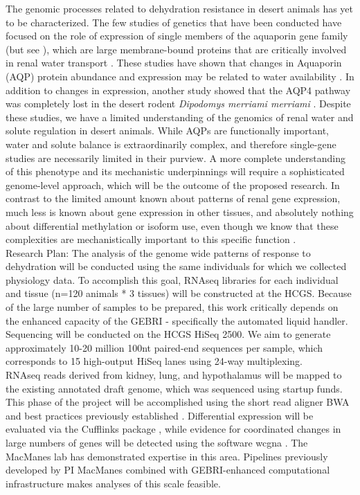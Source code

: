 \documentclass[12pt]{article}
\begin{document}
The genomic processes related to dehydration resistance in desert animals has yet to be characterized. The few studies of genetics that have been conducted have focused on the role of expression of single members of the aquaporin gene family (but see \cite{Bartolo:2007hy}), which are large membrane-bound proteins that are critically involved in renal water transport \citep{Kwon:2009bv,Verkman:2002ww,Brown:1995vo,Nielsen:1995cb}. These studies have shown that changes in Aquaporin (AQP) protein abundance and expression may be related to water availability \citep{Boselt:2009fb, Gallardo:2005fm,Bozinovic:2003eg}. In addition to changes in expression, another study showed that the AQP4 pathway was completely lost in the desert rodent \textit{Dipodomys merriami merriami} \citep{Huang:2001ti}. Despite these studies, we have a limited understanding of the genomics of renal water and solute regulation in desert animals. While AQPs are functionally important, water and solute balance is extraordinarily complex, and therefore single-gene studies are necessarily limited in their purview. A more complete understanding of this phenotype and its mechanistic underpinnings will require a sophisticated genome-level approach, which will be the outcome of the proposed research. In contrast to the limited amount known about patterns of renal gene expression, much less is known about gene expression in other tissues, and absolutely nothing about differential methylation or isoform use, even though we know that these complexities are mechanistically important to this specific function \citep{Yukutake:2010ia,Silberstein:2004ex}. \\

Research Plan: The analysis of the genome wide patterns of response to dehydration will be conducted using the same individuals for which we collected physiology data. To accomplish this goal, RNAseq libraries for each individual and tissue (n=120 animals * 3 tissues) will be constructed at the HCGS. Because of the large number of samples to be prepared, this work critically depends on the enhanced capacity of the GEBRI - specifically the automated liquid handler. Sequencing will be conducted on the HCGS HiSeq 2500. We aim to generate approximately 10-20 million 100nt paired-end sequences per sample, which corresponds to 15 high-output HiSeq lanes using 24-way multiplexing. \\ 

RNAseq reads derived from kidney, lung, and hypothalamus will be mapped to the existing annotated draft genome, which was sequenced using startup funds. This phase of the project will be accomplished using the short read aligner BWA \citep{Li:2013wn} and best practices previously established \citep{MacManes:2014io}. Differential expression will be evaluated via the Cufflinks package \citep{Trapnell:2012kp}, while evidence for coordinated changes in large numbers of genes will be detected using the software wcgna \citep{Langfelder:2008bd}. The MacManes lab has demonstrated expertise in this area. Pipelines previously developed by PI MacManes combined with GEBRI-enhanced computational infrastructure makes analyses of this scale feasible.\\
\end{document}

